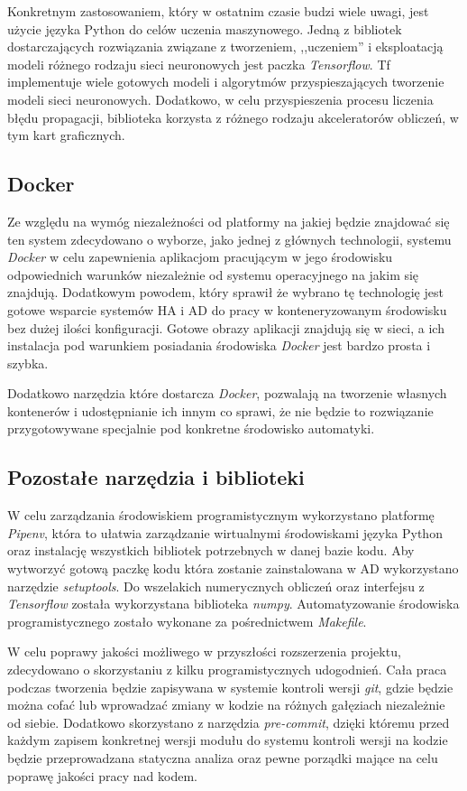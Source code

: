 Konkretnym zastosowaniem, który w ostatnim czasie budzi wiele uwagi, jest użycie języka Python do celów uczenia maszynowego. Jedną z bibliotek dostarczających rozwiązania związane z tworzeniem, ,,uczeniem'' i eksploatacją modeli różnego rodzaju sieci neuronowych jest paczka \textit{Tensorflow}. Tf implementuje wiele gotowych modeli i algorytmów przyspieszających tworzenie modeli sieci neuronowych. Dodatkowo, w celu przyspieszenia procesu liczenia błędu propagacji, biblioteka korzysta z różnego rodzaju akceleratorów obliczeń, w tym kart graficznych.

\subsection{Docker}
Ze względu na wymóg niezależności od platformy na jakiej będzie znajdować się ten system zdecydowano o wyborze, jako jednej z głównych technologii, systemu \textit{Docker} w celu zapewnienia aplikacjom pracującym w jego środowisku odpowiednich warunków niezależnie od systemu operacyjnego na jakim się znajdują. Dodatkowym powodem, który sprawił że wybrano tę technologię jest gotowe wsparcie systemów HA i AD do pracy w konteneryzowanym środowisku bez dużej ilości konfiguracji. Gotowe obrazy aplikacji znajdują się w sieci, a ich instalacja pod warunkiem posiadania środowiska \textit{Docker} jest bardzo prosta i szybka.

Dodatkowo narzędzia które dostarcza \textit{Docker}, pozwalają na tworzenie własnych kontenerów i udostępnianie ich innym co sprawi, że nie będzie to rozwiązanie przygotowywane specjalnie pod konkretne środowisko automatyki.

\subsection{Pozostałe narzędzia i biblioteki}
W celu zarządzania środowiskiem programistycznym wykorzystano platformę \textit{Pipenv}, która to ułatwia zarządzanie wirtualnymi środowiskami języka Python oraz instalację wszystkich bibliotek potrzebnych w danej bazie kodu. Aby wytworzyć gotową paczkę kodu która zostanie zainstalowana w AD wykorzystano narzędzie \textit{setuptools}. Do wszelakich numerycznych obliczeń oraz interfejsu z \textit{Tensorflow} została wykorzystana biblioteka \textit{numpy}. Automatyzowanie środowiska programistycznego zostało wykonane za pośrednictwem \textit{Makefile}. 

W celu poprawy jakości możliwego w przyszłości rozszerzenia projektu, zdecydowano o skorzystaniu z kilku programistycznych udogodnień. Cała praca podczas tworzenia będzie zapisywana w systemie kontroli wersji \textit{git}, gdzie będzie można cofać lub wprowadzać zmiany w kodzie na różnych gałęziach niezależnie od siebie. Dodatkowo skorzystano z narzędzia \textit{pre-commit}, dzięki któremu przed każdym zapisem konkretnej wersji modułu do systemu kontroli wersji na kodzie będzie przeprowadzana statyczna analiza oraz pewne porządki mające na celu poprawę jakości pracy nad kodem.


